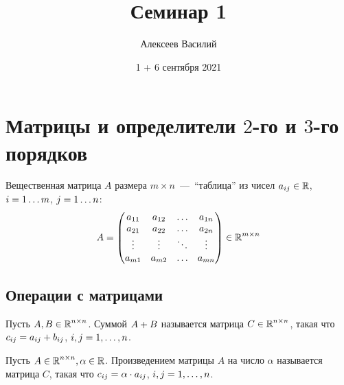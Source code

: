 \documentclass[a4paper,12pt]{article}
\author{Алексеев Василий}
\title{Семинар 1}
\date{1 + 6 сентября 2021}
\begin{document}
  \maketitle
  
  \tableofcontents

  \thispagestyle{empty}
  
  \newpage
  


  \section{Матрицы и определители $2$-го и $3$-го порядков}

  Вещественная матрица $A$ размера $m \times n$~---~``таблица'' из чисел $a_{ij} \hm\in \RR$, $i \hm= 1 \ldots m$, $j \hm= 1 \ldots n$:
  \[
    A = \begin{pmatrix}
      a_{11} & a_{12} & \ldots & a_{1n}\\
      a_{21} & a_{22} & \ldots & a_{2n}\\
      \vdots & \vdots & \ddots & \vdots\\
      a_{m1} & a_{m2} & \ldots & a_{mn}
    \end{pmatrix} \in \operatorname{\mathbb R}^{m \times n}
  \]
  
  
  \subsection{Операции с матрицами}
  
  \begin{definition}
    Пусть $A, B \in \operatorname{\mathbb R}^{n \times n}$.
    Суммой $A \hm+ B$ называется матрица $C \hm\in \RR^{n \times n}$, такая что
    $c_{ij} \hm= a_{ij} + b_{ij}$, $i, j \hm= 1, \ldots, n$.
  \end{definition}
  
  \begin{definition}
    Пусть $A \in \operatorname{\mathbb R}^{n \times n}, \alpha \in \operatorname{\mathbb R}$.
    Произведением матрицы $A$ на число $\alpha$ называется матрица $C$, такая что
    $c_{ij} \hm= \alpha \cdot a_{ij}$, $i, j \hm= 1, \ldots, n$.
  \end{definition}
  
\end{document}
